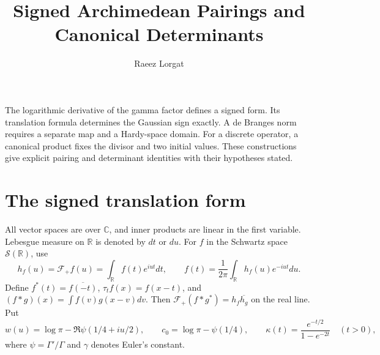 \documentclass[11pt]{article}
\title{Signed Archimedean Pairings and Canonical Determinants}
\author{Raeez Lorgat}
\date{}
\begin{document}
\maketitle

The logarithmic derivative of the gamma factor defines a signed form.
Its translation formula determines the Gaussian sign exactly.
A de Branges norm requires a separate map and a Hardy-space domain.
For a discrete operator, a canonical product fixes the divisor and two initial values.
These constructions give explicit pairing and determinant identities with their hypotheses stated.

\section{The signed translation form}

All vector spaces are over $\mathbb C$, and inner products are linear in the first variable.
Lebesgue measure on $\mathbb R$ is denoted by $dt$ or $du$.
For $f$ in the Schwartz space $\mathcal S(\mathbb R)$, use
\[
 h_f(u)=\mathcal F_+f(u)=\int_{\mathbb R}f(t)e^{iut}dt,
 \qquad
 f(t)=\frac1{2\pi}\int_{\mathbb R}h_f(u)e^{-iut}du.
\]
Define $f^*(t)=\overline{f(-t)}$, $\tau_t f(x)=f(x-t)$, and
$(f*g)(x)=\int f(v)g(x-v)dv$.
Then $\mathcal F_+(f*g^*)=h_f\overline{h_g}$ on the real line.
Put
\[
 w(u)=\log\pi-\Re\psi(1/4+iu/2),\qquad
 c_0=\log\pi-\psi(1/4),\qquad
 \kappa(t)=\frac{e^{-t/2}}{1-e^{-2t}}\quad(t>0),
\]
where $\psi=\Gamma'/\Gamma$ and $\gamma$ denotes Euler's constant.
\end{document}
